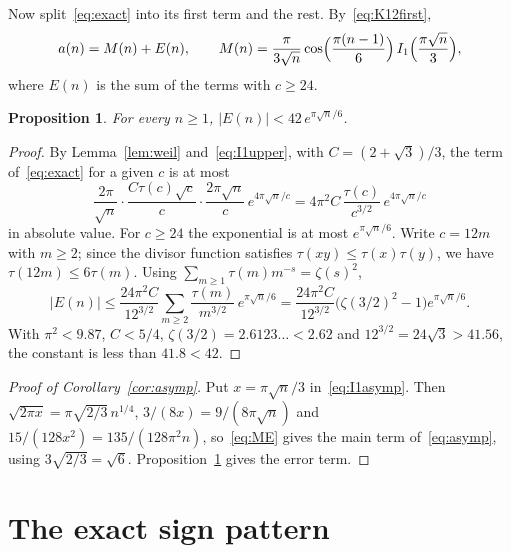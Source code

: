\documentclass[11pt]{amsart}
\numberwithin{equation}{section}
\newtheorem{proposition}[theorem]{Proposition}
\theoremstyle{definition}
\theoremstyle{remark}
\begin{document}
Now split~\eqref{eq:exact} into its first term and the rest. By~\eqref{eq:K12first},
\begin{equation}\label{eq:ME}
a(n)=M(n)+E(n),\qquad M(n)=\frac{\pi}{3\sqrt n}\cos\Bigl(\frac{\pi(n-1)}6\Bigr)\,I_1\Bigl(\frac{\pi\sqrt n}{3}\Bigr),
\end{equation}
where $E(n)$ is the sum of the terms with $c\ge24$.

\begin{proposition}\label{prop:tail}
For every $n\ge1$, $|E(n)|<42\,e^{\pi\sqrt n/6}$.
\end{proposition}

\begin{proof}
By Lemma~\ref{lem:weil} and~\eqref{eq:I1upper}, with $C=(2+\sqrt3)/3$, the term of~\eqref{eq:exact} for a given $c$ is at most
\[
\frac{2\pi}{\sqrt n}\cdot\frac{C\tau(c)\sqrt c}{c}\cdot\frac{2\pi\sqrt n}{c}\,e^{4\pi\sqrt n/c}
=4\pi^2C\,\frac{\tau(c)}{c^{3/2}}\,e^{4\pi\sqrt n/c}
\]
in absolute value. For $c\ge24$ the exponential is at most $e^{\pi\sqrt n/6}$. Write $c=12m$ with $m\ge2$; since the divisor function satisfies $\tau(xy)\le\tau(x)\tau(y)$, we have $\tau(12m)\le6\tau(m)$. Using $\sum_{m\ge1}\tau(m)m^{-s}=\zeta(s)^2$,
\[
|E(n)|\le\frac{24\pi^2C}{12^{3/2}}\sum_{m\ge2}\frac{\tau(m)}{m^{3/2}}\,e^{\pi\sqrt n/6}
=\frac{24\pi^2C}{12^{3/2}}\bigl(\zeta(3/2)^2-1\bigr)e^{\pi\sqrt n/6}.
\]
With $\pi^2<9.87$, $C<5/4$, $\zeta(3/2)=2.6123\ldots<2.62$ and $12^{3/2}=24\sqrt3>41.56$, the constant is less than $41.8<42$.
\end{proof}

\begin{proof}[Proof of Corollary~\ref{cor:asymp}]
Put $x=\pi\sqrt n/3$ in~\eqref{eq:I1asymp}. Then $\sqrt{2\pi x}=\pi\sqrt{2/3}\,n^{1/4}$, $3/(8x)=9/(8\pi\sqrt n)$ and $15/(128x^2)=135/(128\pi^2n)$, so~\eqref{eq:ME} gives the main term of~\eqref{eq:asymp}, using $3\sqrt{2/3}=\sqrt6$. Proposition~\ref{prop:tail} gives the error term.
\end{proof}

\section{The exact sign pattern}\label{sec:signs}
\end{document}
